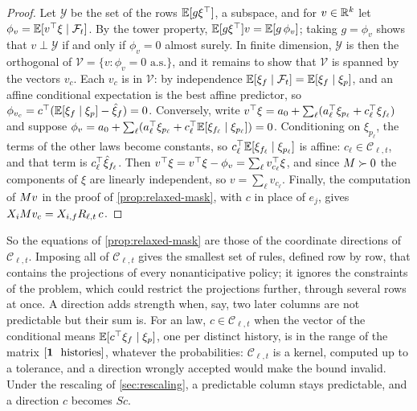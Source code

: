 \begin{proof}
Let $\mathcal Y$ be the set of the rows $\mathbb{E}[g\xi^\top]$, a subspace, and for $v \in \mathbb{R}^k$ let $\phi_v = \mathbb{E}[v^\top\xi \mid \mathcal F_t]$.
By the tower property, $\mathbb{E}[g\xi^\top]v = \mathbb{E}[g\,\phi_v]$; taking $g = \phi_v$ shows that $v \perp \mathcal Y$ if and only if $\phi_v = 0$ almost surely.
In finite dimension, $\mathcal Y$ is then the orthogonal of $\mathcal V = \{v : \phi_v = 0 \text{ a.s.}\}$, and it remains to show that $\mathcal V$ is spanned by the vectors $v_c$.
Each $v_c$ is in $\mathcal V$: by independence $\mathbb{E}[\xi_f \mid \mathcal F_t] = \mathbb{E}[\xi_f \mid \xi_p]$, and an affine conditional expectation is the best affine predictor, so $\phi_{v_c} = c^\top(\mathbb{E}[\xi_f\mid\xi_p] - \hat\xi_f) = 0$.
Conversely, write $v^\top\xi = a_0 + \sum_\ell (a_\ell^\top\xi_{p_\ell} + c_\ell^\top\xi_{f_\ell})$ and suppose $\phi_v = a_0 + \sum_\ell(a_\ell^\top\xi_{p_\ell} + c_\ell^\top\mathbb{E}[\xi_{f_\ell}\mid\xi_{p_\ell}]) = 0$.
Conditioning on $\xi_{p_\ell}$, the terms of the other laws become constants, so $c_\ell^\top\mathbb{E}[\xi_{f_\ell}\mid\xi_{p_\ell}]$ is affine: $c_\ell \in \mathcal C_{\ell,t}$, and that term is $c_\ell^\top\hat\xi_{f_\ell}$.
Then $v^\top\xi = v^\top\xi - \phi_v = \sum_\ell v_{c_\ell}^\top\xi$, and since $M \succ 0$ the components of $\xi$ are linearly independent, so $v = \sum_\ell v_{c_\ell}$.
Finally, the computation of $M v$ in the proof of \cref{prop:relaxed-mask}, with $c$ in place of $e_j$, gives $X_iM v_c = X_{i,f}R_{\ell,t}\,c$.
\end{proof}

So the equations of \cref{prop:relaxed-mask} are those of the coordinate directions of $\mathcal C_{\ell,t}$.
Imposing all of $\mathcal C_{\ell,t}$ gives the smallest set of rules, defined row by row, that contains the projections of every nonanticipative policy;
it ignores the constraints of the problem, which could restrict the projections further, through several rows at once.
A direction adds strength when, say, two later columns are not predictable but their sum is.
For an  law, $c \in \mathcal C_{\ell,t}$ when the vector of the conditional means $\mathbb{E}[c^\top\xi_f \mid \xi_p]$, one per distinct history, is in the range of the matrix $[\one\ \ \text{histories}]$,
whatever the probabilities: $\mathcal C_{\ell,t}$ is a kernel, computed up to a tolerance, and a direction wrongly accepted would make the bound invalid.
Under the rescaling of \cref{sec:rescaling}, a predictable column stays predictable, and a direction $c$ becomes $Sc$.


